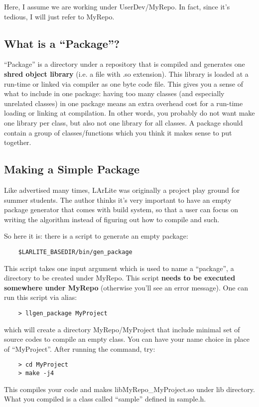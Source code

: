 Here, I assume we are working under {\ttfamily UserDev/MyRepo}. 
In fact, since it's tedious, I will just refer to {\ttfamily MyRepo}.

\subsection{What is a ``Package''?}
``Package'' is a directory under a repository that is compiled and generates one {\bf shred object library}
(i.e. a file with {\ttfamily .so} extension). This library is loaded at a run-time or linked via compiler as one byte code file.
This gives you a sense of what to include in one package: having too many classes (and especially unrelated classes) in one package
means an extra overhead cost for a run-time loading or linking at compilation. In other words, you probably do not want make one 
library per class, but also not one library for all classes. A package should contain a group of \CPP classes/functions which you
think it makes sense to put together.

\subsection{Making a Simple \CPP Package}

Like advertised many times, LArLite was originally a \CPP project play ground for summer students. 
The author thinks it's very important to have an empty \CPP package generator that comes with build system, 
so that a user can focus on writing the algorithm instead of figuring out how to compile and such.

So here it is: there is a \python script to generate an empty \CPP package:
\begin{lstlisting}
    $LARLITE_BASEDIR/bin/gen_package
\end{lstlisting}
This script takes one input argument which is used to name a ``package'', a directory to be created under {\ttfamily MyRepo}.
This script {\bf needs to be executed somewhere under {\ttfamily MyRepo}} (otherwise you'll see an error message).
One can run this script via alias:
\begin{lstlisting}
    > llgen_package MyProject
\end{lstlisting}
which will create a directory {\ttfamily MyRepo/MyProject} that include minimal set of source codes to compile an empty \CPP class. 
You can have your name choice in place of ``MyProject''. After running the command, try:
\begin{lstlisting}
    > cd MyProject
    > make -j4
\end{lstlisting}
This compiles your code and makes {\ttfamily libMyRepo\_MyProject.so} under {\ttfamily lib} directory.
What you compiled is a \CPP class called ``sample'' defined in {\ttfamily sample.h}. 


